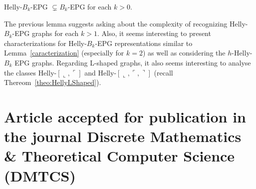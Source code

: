 \begin{lemma}
Helly-$B_k$-EPG $\subsetneq B_k$-EPG for each $k>0$.
\end{lemma}

The previous lemma suggests asking about the complexity of recognizing Helly-$B_k$-EPG graphs for each $k>1$. Also, it seems interesting to present characterizations for Helly-$B_k$-EPG representations similar to Lemma~\ref{caracterization} (especially for $k=2$) as well as considering the $h$-Helly-$B_k$ EPG graphs. Regarding L-shaped graphs, it also seems interesting to analyse the classes Helly-$[\llcorner, \ulcorner]$ and Helly-$[\llcorner, \ulcorner, \urcorner]$ (recall Thereom~\ref{theo:HellyLShaped}).




\section{Article accepted for publication in the journal  Discrete Mathematics \& Theoretical Computer Science (DMTCS)} 
%

